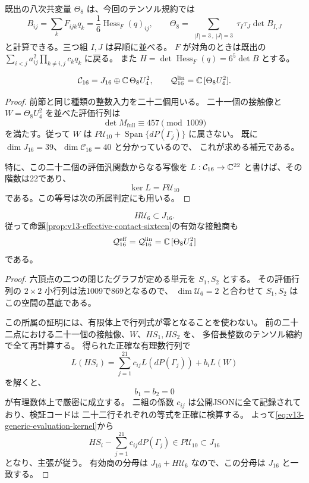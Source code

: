 既出の八次共変量 $\Theta_8$ は、今回のテンソル規約では
\begin{equation}\label{eq:v13-theta-general-tensor}
 B_{ij}=\sum_kF_{ijk}q_k=\frac16\operatorname{Hess}_F(q)_{ij},
 \qquad
 \Theta_8=\sum_{\substack{|I|=3\,,\ |J|=3}}
          \tau_I\tau_J\det B_{I,J}
\end{equation}
と計算できる。三つ組 $I,J$ は昇順に並べる。
$F$ が対角のときは既出の
$\sum_{i<j}a_{ij}^2\prod_{k\ne i,j}c_kq_k$ に戻る。
また $H=\det\operatorname{Hess}_F(q)=6^5\det B$ とする。

\begin{proposition}[16次の通常接触商の生成元]
\label{prop:v13-sixteenth-complement}
\[
 \mathcal C_{16}=J_{16}\oplus\mathbb C\,\Theta_8U_4^2,
 \qquad
 \mathcal Q^{\mathrm{lin}}_{16}=\mathbb C\,[\Theta_8U_4^2].
\]
\end{proposition}
\begin{proof}
前節と同じ種類の整数入力を二十二個用いる。
二十一個の接触像と $W=\Theta_8U_4^2$ を並べた評価行列は
\[
 \det M_{\mathrm{full}}\equiv457\pmod{1009}
\]
を満たす。従って $W$ は
$P\mathcal U_{10}+\operatorname{Span}\{dP(\Gamma_j)\}$ に属さない。
既に $\dim J_{16}=39$、$\dim\mathcal C_{16}=40$ と分かっているので、
これが求める補元である。

特に、この二十二個の評価汎関数からなる写像を
$L:\mathcal C_{16}\to\mathbb C^{22}$ と書けば、その階数は22であり、
\begin{equation}\label{eq:v13-generic-evaluation-kernel}
 \ker L=P\mathcal U_{10}
\end{equation}
である。この等号は次の所属判定にも用いる。
\end{proof}

\begin{proposition}[Hessianの六次単元倍も通常接触像に入る]
\label{prop:v13-hessian-unit-membership}
\[
 H\mathcal U_6\subset J_{16}.
\]
従って命題\ref{prop:v13-effective-contact-sixteen}の有効な接触商も
\[
 \mathcal Q^{\mathrm{eff}}_{16}
 =\mathcal Q^{\mathrm{lin}}_{16}
 =\mathbb C\,[\Theta_8U_4^2]
\]
である。
\end{proposition}
\begin{proof}
六頂点の二つの閉じたグラフが定める単元を $S_1,S_2$ とする。
その評価行列の $2\times2$ 小行列は法1009で869となるので、
$\dim\mathcal U_6=2$ と合わせて $S_1,S_2$ はこの空間の基底である。

この所属の証明には、有限体上で行列式が零となることを使わない。
前の二十二点における二十一個の接触像、$W$、$HS_1,HS_2$ を、
多倍長整数のテンソル縮約で全て再計算する。
得られた正確な有理数行列で
\[
 L(HS_i)=\sum_{j=1}^{21}c_{ij}L(dP(\Gamma_j))+b_iL(W)
\]
を解くと、
\[
 b_1=b_2=0
\]
が有理数体上で厳密に成立する。
二組の係数 $c_{ij}$ は公開JSONに全て記録されており、検証コードは
二十二行それぞれの等式を正確に検算する。
よって\eqref{eq:v13-generic-evaluation-kernel}から
\[
 HS_i-\sum_{j=1}^{21}c_{ij}dP(\Gamma_j)\in P\mathcal U_{10}\subset J_{16}
\]
となり、主張が従う。
有効商の分母は $J_{16}+H\mathcal U_6$ なので、この分母は $J_{16}$ と一致する。
\end{proof}

